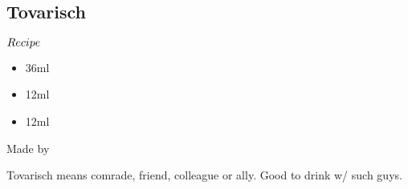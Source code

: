 \subsection{Tovarisch}
\begin{itembox}[l]{\boldmath $Recipe$}
\begin{itemize}
\setlength{\parskip}{0cm}
\setlength{\itemsep}{0cm}
\item \vodka 36ml
\item \kummel 12ml
\item \limj 12ml
\end{itemize}
\vspace{-4mm}
Made by \shake
\end{itembox}
Tovarisch means comrade, friend, colleague or ally. Good to drink w/ such guys.

